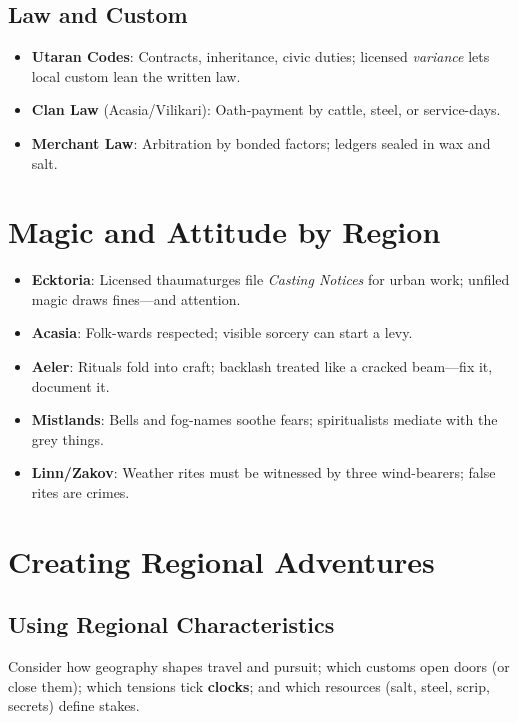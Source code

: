 \subsection*{Law and Custom}
\begin{itemize}
\item \textbf{Utaran Codes}: Contracts, inheritance, civic duties; licensed \emph{variance} lets local custom lean the written law.
\item \textbf{Clan Law} (Acasia/Vilikari): Oath-payment by cattle, steel, or service-days.
\item \textbf{Merchant Law}: Arbitration by bonded factors; ledgers sealed in wax and salt.
\end{itemize}

\section{Magic and Attitude by Region}

\begin{itemize}
\item \textbf{Ecktoria}: Licensed thaumaturges file \emph{Casting Notices} for urban work; unfiled magic draws fines---and attention.
\item \textbf{Acasia}: Folk-wards respected; visible sorcery can start a levy.
\item \textbf{Aeler}: Rituals fold into craft; backlash treated like a cracked beam—fix it, document it.
\item \textbf{Mistlands}: Bells and fog-names soothe fears; spiritualists mediate with the grey things.
\item \textbf{Linn/Zakov}: Weather rites must be witnessed by three wind-bearers; false rites are crimes.
\end{itemize}

\section{Creating Regional Adventures}

\subsection*{Using Regional Characteristics}
Consider how geography shapes travel and pursuit; which customs open doors (or close them); which tensions tick \textbf{clocks}; and which resources (salt, steel, scrip, secrets) define stakes.


